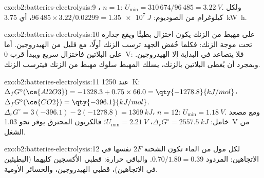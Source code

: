 \begin{solution}{exo:b2:batteries-electrolysis:9}
، $n = 1$: $U_{\min} = 310\,674/96\,485 = \qty{3.22}{V}$.
ولكل كيلوغرام من الصوديوم: $96\,485 \times 3.22/0.02299 = \qty{1.35e7}{J}$، أي
\qty{3.75}{kW.h}.
\end{solution}

\begin{solution}{exo:b2:batteries-electrolysis:10}
على مهبط من الزنك يكون اختزال  بطيئًا ويقع جداره تحت
موجة الزنك: فكلما خُفض الجهد ترسب الزنك أولًا، مع قليل من
الهيدروجين. أما على البلاتين فاختزال  سريع ويبدأ قرب
\qty{0}{V}: فلا يتصاعد في البداية إلا الهيدروجين. وبمجرد أن يُغطى البلاتين
بالزنك، يسلك المهبط سلوك مهبط من الزنك فيترسب الزنك.
\end{solution}

\begin{solution}{exo:b2:batteries-electrolysis:11}
عند \qty{1250}{K}: $\Delta_f G^\circ(\ce{Al2O3}) = -1328.3 + 0.75 \times 66.0 =
\qty{-1278.8}{kJ/mol}$، $\Delta_f G^\circ(\ce{CO2}) = \qty{-396.1}{kJ/mol}$. $\Delta_r G^\circ =
3(-396.1) - 2(-1278.8) = \qty{1369}{kJ}$، $n = 12$: $U_{\min} = \qty{1.18}{V}$. ومع مصعد خامل:
$\Delta_r G^\circ = \qty{2557.5}{kJ}$، $U_{\min} = \qty{2.21}{V}$؛ فالكربون المحترق
يوفر نحو \qty{1.03}{V} من الشغل.
\end{solution}

\begin{solution}{exo:b2:batteries-electrolysis:12}
لكل مول من الماء تكون الشحنة $2F$ نفسها في الاتجاهين: المردود $0.70/1.80 =
0.39$. والباقي حرارة:  قطبي الأكسجين كليهما (البطيئين في
الاتجاهين)،  قطبي الهيدروجين، والخسائر الأومية.
\end{solution}

